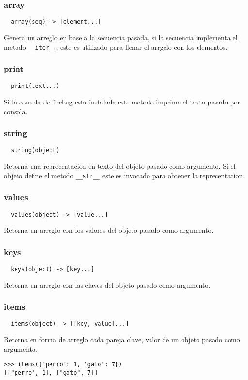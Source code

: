 \subsubsection*{array}
\begin{verbatim}
  array(seq) -> [element...]
\end{verbatim}
Genera un arreglo en base a la secuencia pasada, si la secuencia implementa el
metodo \verb|__iter__|, este es utilizado para llenar el arrgelo con los
elementos.

\subsubsection*{print}
\begin{verbatim}
  print(text...)
\end{verbatim}
Si la consola de firebug esta instalada este metodo imprime el texto pasado por
consola.

\subsubsection*{string}
\begin{verbatim}
  string(object)
\end{verbatim}
Retorna una reprecentacion en texto del objeto pasado como argumento.
Si el objeto define el metodo \verb|__str__| este es invocado para obtener la
reprecentacion.

\subsubsection*{values}
\begin{verbatim}
  values(object) -> [value...]
\end{verbatim}
Retorna un arreglo con los valores del objeto pasado como argumento.

\subsubsection*{keys}
\begin{verbatim}
  keys(object) -> [key...]
\end{verbatim}
Retorna un arreglo con las claves del objeto pasado como argumento.

\subsubsection*{items}
\begin{verbatim}
  items(object) -> [[key, value]...]
\end{verbatim}
Retorna en forma de arreglo cada pareja clave, valor de un objeto pasado como
argumento.
\begin{lstlisting}[style=consola]
>>> items({'perro': 1, 'gato': 7})
[["perro", 1], ["gato", 7]]
\end{lstlisting}

